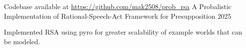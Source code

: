 \begin{cventries}
\cventry
{Codebase available at \url{https://github.com/mak2508/prob_rsa}} %
{A Probalistic Implementation of Rational-Speech-Act Framework for Presupposition} %
{} %
{2025} %
{
  \begin{cvitems} %
    \item {Implemented RSA using pyro for greater scalability of example worlds that can be modeled.}
  \end{cvitems}
}

\end{cventries}
